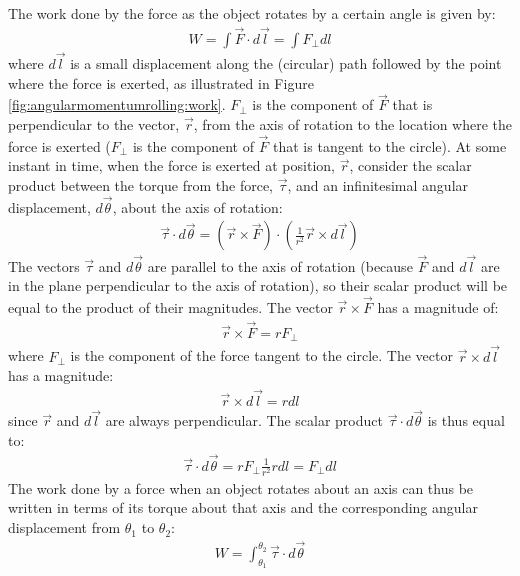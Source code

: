 The work done by the force as the object rotates by a certain angle is given by:
\begin{align*}
W = \int \vec F \cdot d\vec l = \int F_\perp dl
\end{align*}
where $d\vec l$ is a small displacement along the (circular) path followed by the point where the force is exerted, as illustrated in Figure \ref{fig:angularmomentumrolling:work}. $F_\perp$ is the component of $\vec F$ that is perpendicular to the vector, $\vec r$, from the axis of rotation to the location where the force is exerted ($F_\perp$ is the component of $\vec F$ that is tangent to the circle).
At some instant in time, when the force is exerted at position, $\vec r$, consider the scalar product between the torque from the force, $\vec \tau$, and an infinitesimal angular displacement, $d\vec \theta$, about the axis of rotation:
\begin{align*}
\vec\tau \cdot d\vec\theta = (\vec r \times \vec F) \cdot \left(\frac{1}{r^2} \vec r\times d\vec l\right)
\end{align*}
The vectors $\vec \tau$ and $d\vec \theta$ are parallel to the axis of rotation (because $\vec F$ and $d\vec l$ are in the plane perpendicular to the axis of rotation), so their scalar product will be equal to the product of their magnitudes. The vector $\vec r \times \vec F$ has a magnitude of:
\begin{align*}
\vec r \times \vec F = rF_\perp
\end{align*} 
where $F_\perp$ is the component of the force tangent to the circle. The vector $\vec r\times d\vec l$ has a magnitude:
\begin{align*}
\vec r\times d\vec l = rdl
\end{align*}
since $\vec r$ and $d\vec l$ are always perpendicular. The scalar product $\vec\tau \cdot d\vec\theta$ is thus equal to:
\begin{align*}
\vec\tau \cdot d\vec\theta = rF_\perp \frac{1}{r^2} rdl = F_\perp dl
\end{align*}
The work done by a force when an object rotates about an axis can thus be written in terms of its torque about that axis and the corresponding angular displacement from $\theta_1$ to $\theta_2$:
\begin{align}
W = \int_{\theta_1}^{\theta_2}\vec\tau\cdot d\vec \theta
\end{align}

